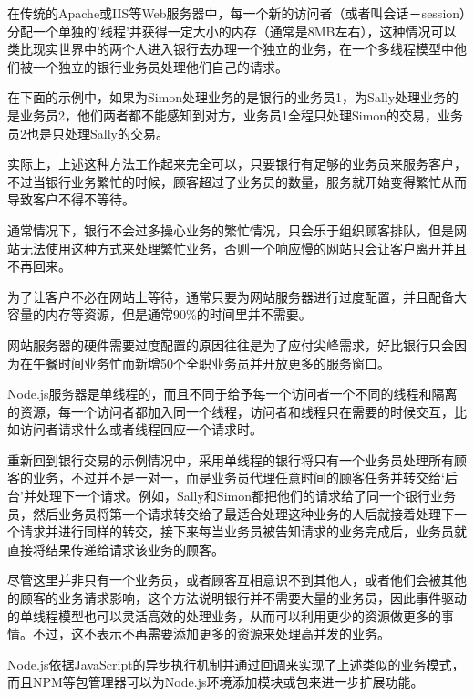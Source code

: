 在传统的Apache或IIS等Web服务器中，每一个新的访问者（或者叫会话－session）分配一个单独的'线程'并获得一定大小的内存（通常是8MB左右），这种情况可以类比现实世界中的两个人进入银行去办理一个独立的业务，在一个多线程模型中他们被一个独立的银行业务员处理他们自己的请求。



在下面的示例中，如果为Simon处理业务的是银行的业务员1，为Sally处理业务的是业务员2，他们两者都不能感知到对方，业务员1全程只处理Simon的交易，业务员2也是只处理Sally的交易。

实际上，上述这种方法工作起来完全可以，只要银行有足够的业务员来服务客户，不过当银行业务繁忙的时候，顾客超过了业务员的数量，服务就开始变得繁忙从而导致客户不得不等待。

通常情况下，银行不会过多操心业务的繁忙情况，只会乐于组织顾客排队，但是网站无法使用这种方式来处理繁忙业务，否则一个响应慢的网站只会让客户离开并且不再回来。

为了让客户不必在网站上等待，通常只要为网站服务器进行过度配置，并且配备大容量的内存等资源，但是通常90\%的时间里并不需要。

网站服务器的硬件需要过度配置的原因往往是为了应付尖峰需求，好比银行只会因为在午餐时间业务忙而新增50个全职业务员并开放更多的服务窗口。

Node.js服务器是单线程的，而且不同于给予每一个访问者一个不同的线程和隔离的资源，每一个访问者都加入同一个线程，访问者和线程只在需要的时候交互，比如访问者请求什么或者线程回应一个请求时。

重新回到银行交易的示例情况中，采用单线程的银行将只有一个业务员处理所有顾客的业务，不过并不是一对一，而是业务员代理任意时间的顾客任务并转交给‘后台’并处理下一个请求。例如，Sally和Simon都把他们的请求给了同一个银行业务员，然后业务员将第一个请求转交给了最适合处理这种业务的人后就接着处理下一个请求并进行同样的转交，接下来每当业务员被告知请求的业务完成后，业务员就直接将结果传递给请求该业务的顾客。

尽管这里并非只有一个业务员，或者顾客互相意识不到其他人，或者他们会被其他的顾客的业务请求影响，这个方法说明银行并不需要大量的业务员，因此事件驱动的单线程模型也可以灵活高效的处理业务，从而可以利用更少的资源做更多的事情。不过，这不表示不再需要添加更多的资源来处理高并发的业务。

Node.js依据JavaScript的异步执行机制并通过回调来实现了上述类似的业务模式，而且NPM等包管理器可以为Node.js环境添加模块或包来进一步扩展功能。





\begin{lstlisting}[language=bash]

\end{lstlisting}




